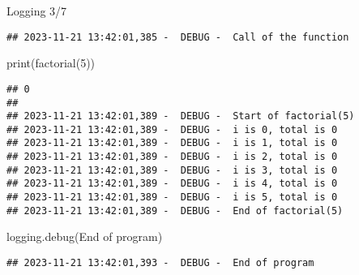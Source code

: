 \documentclass[
  8pt,
  ignorenonframetext,
]{beamer}
\newenvironment{Shaded}{\begin{snugshade}}{\end{snugshade}}
\newcommand{\BuiltInTok}[1]{#1}
\newcommand{\DecValTok}[1]{\textcolor[rgb]{0.00,0.00,0.81}{#1}}
\newcommand{\NormalTok}[1]{#1}
\newcommand{\StringTok}[1]{\textcolor[rgb]{0.31,0.60,0.02}{#1}}
\begin{document}
\begin{frame}[fragile]{Logging 3/7}
\begin{verbatim}
## 2023-11-21 13:42:01,385 -  DEBUG -  Call of the function
\end{verbatim}

\begin{Shaded}
\begin{Highlighting}[]
\BuiltInTok{print}\NormalTok{(factorial(}\DecValTok{5}\NormalTok{))}
\end{Highlighting}
\end{Shaded}

\begin{verbatim}
## 0
## 
## 2023-11-21 13:42:01,389 -  DEBUG -  Start of factorial(5)
## 2023-11-21 13:42:01,389 -  DEBUG -  i is 0, total is 0
## 2023-11-21 13:42:01,389 -  DEBUG -  i is 1, total is 0
## 2023-11-21 13:42:01,389 -  DEBUG -  i is 2, total is 0
## 2023-11-21 13:42:01,389 -  DEBUG -  i is 3, total is 0
## 2023-11-21 13:42:01,389 -  DEBUG -  i is 4, total is 0
## 2023-11-21 13:42:01,389 -  DEBUG -  i is 5, total is 0
## 2023-11-21 13:42:01,389 -  DEBUG -  End of factorial(5)
\end{verbatim}

\begin{Shaded}
\begin{Highlighting}[]
\NormalTok{logging.debug(}\StringTok{\textquotesingle{}End of program\textquotesingle{}}\NormalTok{)}
\end{Highlighting}
\end{Shaded}

\begin{verbatim}
## 2023-11-21 13:42:01,393 -  DEBUG -  End of program
\end{verbatim}
\end{frame}
\end{document}

